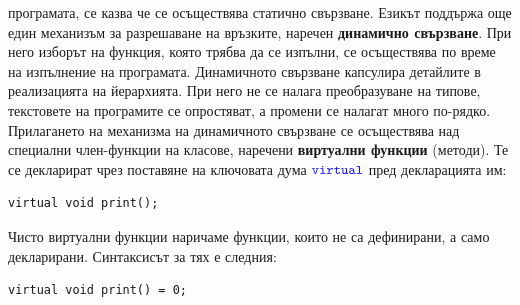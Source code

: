 \documentclass{article}
\begin{document}
програмата, се казва че се осъществява статично свързване. Езикът поддържа още един механизъм за разрешаване на връзките, наречен
\textbf{динамично свързване}. При него изборът на функция, която трябва да се изпълни, се осъществява по време на изпълнение на програмата.
Динамичното свързване капсулира детайлите в реализацията на йерархията. При него не се налага преобразуване на типове, текстовете
на програмите се опростяват, а промени се налагат много по-рядко. Прилагането на механизма на динамичното свързване се осъществява
над специални член-функции на класове, наречени \textbf{виртуални функции} (методи). Те се декларират чрез поставяне на ключовата
дума $\textcolor{blue}{\texttt{virtual}}$ пред декларацията им:
\begin{lstlisting}[style=cpp]
virtual void print();
\end{lstlisting}

Чисто виртуални функции наричаме функции, които не са дефинирани, а само декларирани. Синтаксисът за тях е следния:
\begin{lstlisting}[style=cpp]
virtual void print() = 0;
\end{lstlisting}
\end{document}
